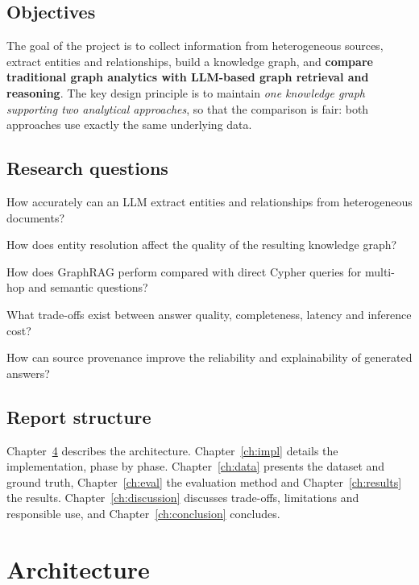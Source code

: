 \documentclass[11pt,a4paper]{report}
\newcommand{\RQ}[1]{\textbf{RQ#1}}
\begin{document}
\section{Objectives}
The goal of the project is to collect information from heterogeneous sources, extract entities and relationships,
build a knowledge graph, and \textbf{compare traditional graph analytics with LLM-based graph retrieval and
reasoning}. The key design principle is to maintain \emph{one knowledge graph supporting two analytical approaches},
so that the comparison is fair: both approaches use exactly the same underlying data.

\section{Research questions}
\begin{description}[leftmargin=1.4cm,style=nextline]
  \item[\RQ{1}] How accurately can an LLM extract entities and relationships from heterogeneous documents?
  \item[\RQ{2}] How does entity resolution affect the quality of the resulting knowledge graph?
  \item[\RQ{3}] How does GraphRAG perform compared with direct Cypher queries for multi-hop and semantic questions?
  \item[\RQ{4}] What trade-offs exist between answer quality, completeness, latency and inference cost?
  \item[\RQ{5}] How can source provenance improve the reliability and explainability of generated answers?
\end{description}

\section{Report structure}
Chapter~\ref{ch:archi} describes the architecture. Chapter~\ref{ch:impl} details the implementation, phase by
phase. Chapter~\ref{ch:data} presents the dataset and ground truth, Chapter~\ref{ch:eval} the evaluation method and
Chapter~\ref{ch:results} the results. Chapter~\ref{ch:discussion} discusses trade-offs, limitations and responsible
use, and Chapter~\ref{ch:conclusion} concludes.

\chapter{Architecture}\label{ch:archi}
\end{document}

